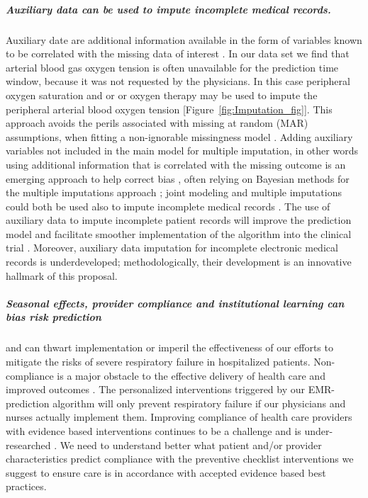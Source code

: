\documentclass[11pt,notitlepage]{article}
\begin{document}
\subparagraph*{Auxiliary data can be used to impute incomplete medical records.}
Auxiliary date are additional information available in the form of variables known to be correlated with the missing data of interest \cite{Daniels24571539}. In our data set we find that arterial blood gas oxygen tension is often unavailable for the prediction time window, because it was not requested by the physicians. In this case peripheral oxygen saturation and or or oxygen therapy may be used to impute the peripheral arterial blood oxygen tension [Figure~\ref{fig:Imputation_fig}]. This approach avoids the perils associated with missing at random (MAR) assumptions, when fitting a non-ignorable missingness model \cite{Wang_20029935}. Adding auxiliary variables not included in the main model for multiple imputation, in other words using additional information that is correlated with the missing outcome is an emerging approach to help correct bias \cite{Meng_1994, Collins_11778676, Rubin_1996}, often relying on Bayesian methods for the multiple imputations approach \cite{Daniels_2008, Schafer_1997}; joint modeling and multiple imputations could both be used also to impute incomplete medical records \cite{Fitzmaurice_2008}. The use of auxiliary data to impute incomplete patient records will improve the prediction model and facilitate smoother implementation of the algorithm into the clinical trial \cite{Hall_25389642}. Moreover, auxiliary data imputation for incomplete electronic medical records is underdeveloped; methodologically, their development is an innovative hallmark of this proposal.

\subparagraph*{Seasonal effects, provider compliance and institutional learning can bias risk prediction} and can thwart implementation or imperil the effectiveness of our efforts to mitigate the risks of severe respiratory failure in hospitalized patients. Non-compliance is a major obstacle to the effective delivery of health care and improved outcomes \cite{Duncan_16710766}. The personalized interventions triggered by our EMR-prediction algorithm will only prevent respiratory failure if our physicians and nurses actually implement them. Improving compliance of health care providers with evidence based interventions continues to be a challenge and is under-researched \cite{Davis_7650822}. We need to understand better what patient and/or provider characteristics predict compliance with the preventive checklist interventions we suggest to ensure care is in accordance with accepted evidence based best practices. 
\end{document}
